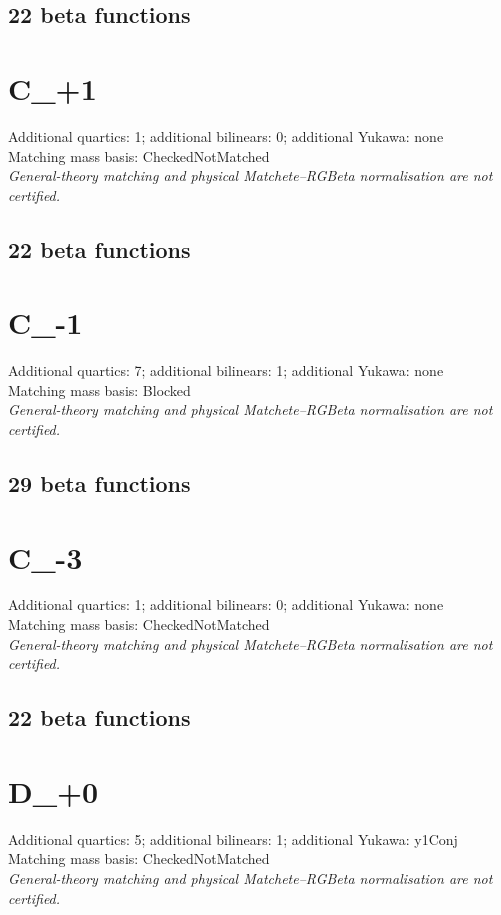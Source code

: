 \documentclass[10pt,a4paper]{article}
\begin{document}
\subsection*{22 beta functions}

\clearpage
\section{C\_+1}
Additional quartics: 1; additional bilinears: 0; additional Yukawa: none\\
Matching mass basis: CheckedNotMatched\\
\emph{General-theory matching and physical Matchete--RGBeta normalisation are not certified.}
\subsection*{22 beta functions}

\clearpage
\section{C\_-1}
Additional quartics: 7; additional bilinears: 1; additional Yukawa: none\\
Matching mass basis: Blocked\\
\emph{General-theory matching and physical Matchete--RGBeta normalisation are not certified.}
\subsection*{29 beta functions}

\clearpage
\section{C\_-3}
Additional quartics: 1; additional bilinears: 0; additional Yukawa: none\\
Matching mass basis: CheckedNotMatched\\
\emph{General-theory matching and physical Matchete--RGBeta normalisation are not certified.}
\subsection*{22 beta functions}

\clearpage
\section{D\_+0}
Additional quartics: 5; additional bilinears: 1; additional Yukawa: y1Conj\\
Matching mass basis: CheckedNotMatched\\
\emph{General-theory matching and physical Matchete--RGBeta normalisation are not certified.}
\end{document}

